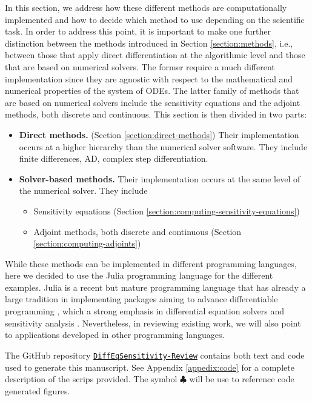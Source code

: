 
In this section, we address how these different methods are computationally implemented and how to decide which method to use depending on the scientific task.
In order to address this point, it is important to make one further distinction between the methods introduced in Section \ref{section:methods}, i.e., between those that apply direct differentiation at the algorithmic level and those that are based on numerical solvers.  
The former require a much different implementation since they are agnostic with respect to the mathematical and numerical properties of the system of ODEs.
The latter family of methods that are based on numerical solvers include the sensitivity equations and the adjoint methods, both discrete and continuous.
This section is then divided in two parts:
\begin{itemize}
    \item \textbf{Direct methods.} (Section \ref{section:direct-methods}) Their implementation occurs at a higher hierarchy than the numerical solver software. They include finite differences, AD, complex step differentiation.
    \item \textbf{Solver-based methods.} Their implementation occurs at the same level of the numerical solver. They include 
    \begin{itemize}
        \item Sensitivity equations (Section \ref{section:computing-sensitivity-equations})
        \item Adjoint methods, both discrete and continuous (Section \ref{section:computing-adjoints})
    \end{itemize}
\end{itemize}
While these methods can be implemented in different programming languages, here we decided to use the Julia programming language for the different examples. 
Julia is a recent but mature programming language that has already a large tradition in implementing packages aiming to advance differentiable programming \cite{Bezanson_Karpinski_Shah_Edelman_2012, Julialang_2017}, which a strong emphasis in differential equation solvers \cite{Rackauckas_Nie_2016} and sensitivity analysis \cite{rackauckas2020universal}.
Nevertheless, in reviewing existing work, we will also point to applications developed in other programming languages.

The GitHub repository \href{https://github.com/ODINN-SciML/DiffEqSensitivity-Review}{\texttt{DiffEqSensitivity-Review}} contains both text and code used to generate this manuscript. 
See Appendix \ref{appedix:code} for a complete description of the scrips provided. 
The symbol $\clubsuit$ will be use to reference code generated figures. 
